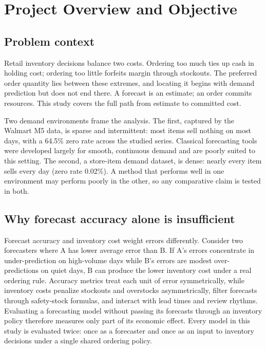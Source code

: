 \section{Project Overview and Objective}
\label{sec:overview}

\subsection{Problem context}
\label{sec:problem}
Retail inventory decisions balance two costs. Ordering too much ties up cash
in holding cost; ordering too little forfeits margin through stockouts. The
preferred order quantity lies between these extremes, and locating it begins
with demand prediction but does not end there. A forecast is an estimate; an
order commits resources. This study covers the full path from estimate to
committed cost.

Two demand environments frame the analysis. The first, captured by the Walmart
M5 data, is sparse and intermittent: most items sell nothing on most days,
with a 64.5\% zero rate across the studied series. Classical forecasting tools
were developed largely for smooth, continuous demand and are poorly suited to
this setting. The second, a store-item demand dataset, is dense: nearly every
item sells every day (zero rate 0.02\%). A method that performs well in one
environment may perform poorly in the other, so any comparative claim is
tested in both.

\subsection{Why forecast accuracy alone is insufficient}
\label{sec:why-not-accuracy}
Forecast accuracy and inventory cost weight errors differently. Consider two
forecasters where A has lower average error than B. If A's errors concentrate
in under-prediction on high-volume days while B's errors are modest
over-predictions on quiet days, B can produce the lower inventory cost under a
real ordering rule. Accuracy metrics treat each unit of error symmetrically,
while inventory costs penalize stockouts and overstocks asymmetrically, filter
forecasts through safety-stock formulas, and interact with lead times and
review rhythms. Evaluating a forecasting model without passing its forecasts
through an inventory policy therefore measures only part of its economic
effect. Every model in this study is evaluated twice: once as a forecaster
and once as an input to inventory decisions under a single shared ordering
policy.

